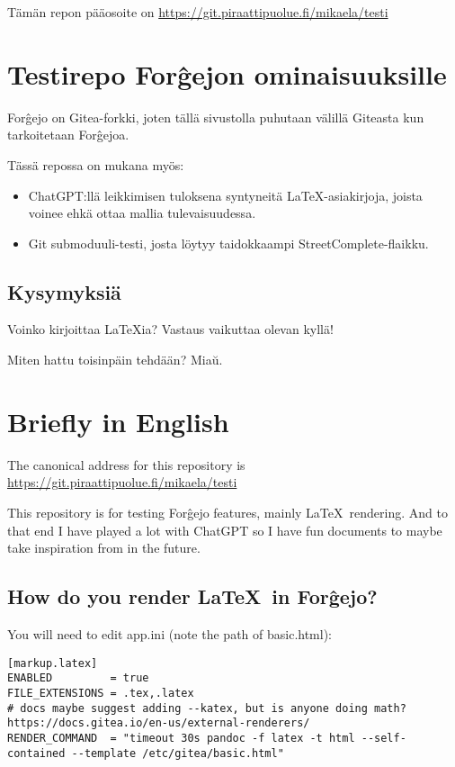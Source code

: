 \documentclass[a4paper,colorlinks,linkcolor=blue]{artikel3}
\begin{document}
\hypersetup{urlcolor=blue}

Tämän repon pääosoite on \url{https://git.piraattipuolue.fi/mikaela/testi}

\section*{Testirepo For\^gejon ominaisuuksille}

For\^gejo on Gitea-forkki, joten tällä sivustolla puhutaan välillä Giteasta kun tarkoitetaan For\^gejoa.

Tässä repossa on mukana myös:


\begin{itemize}
    \item ChatGPT:llä leikkimisen tuloksena syntyneitä \LaTeX -asiakirjoja, joista voinee ehkä ottaa mallia tulevaisuudessa.
    \item Git submoduuli-testi, josta löytyy taidokkaampi StreetComplete-flaikku.
\end{itemize}

\subsection*{Kysymyksiä}
Voinko kirjoittaa \LaTeX ia?
Vastaus vaikuttaa olevan kyllä!

Miten hattu toisinpäin tehdään?
Mia\u{u}.


\section*{Briefly in English}

The canonical address for this repository is \url{https://git.piraattipuolue.fi/mikaela/testi}

This repository is for testing For\^gejo features, mainly \LaTeX\ rendering.
And to that end I have played a lot with ChatGPT so I have fun documents to maybe take inspiration from in the future.

\subsection*{How do you render \LaTeX\ in For\^gejo?}

You will need to edit app.ini (note the path of basic.html):

\begin{verbatim}
[markup.latex]
ENABLED         = true
FILE_EXTENSIONS = .tex,.latex
# docs maybe suggest adding --katex, but is anyone doing math? https://docs.gitea.io/en-us/external-renderers/
RENDER_COMMAND  = "timeout 30s pandoc -f latex -t html --self-contained --template /etc/gitea/basic.html"
\end{verbatim}
\end{document}
